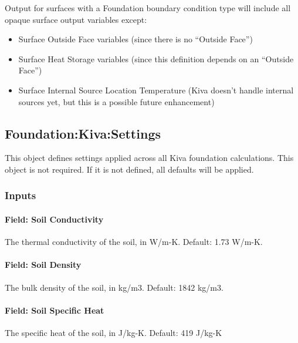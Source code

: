 Output for surfaces with a Foundation boundary condition type will
include all opaque surface output variables except:

\begin{itemize}
\tightlist
\item
  Surface Outside Face variables (since there is no ``Outside Face'')
\item
  Surface Heat Storage variables (since this definition depends on an
  ``Outside Face'')
\item
  Surface Internal Source Location Temperature (Kiva doesn't handle
  internal sources yet, but this is a possible future enhancement)
\end{itemize}

\subsection{Foundation:Kiva:Settings}\label{foundation-kiva-settings}

This object defines settings applied across all Kiva foundation
calculations. This object is not required. If it is not defined, all
defaults will be applied.

\subsubsection{Inputs}\label{foundation-kiva-settings-inputs}

\paragraph{Field: Soil Conductivity}\label{foundation-kiva-settings-soil-conductivity}

The thermal conductivity of the soil, in W/m-K. Default: 1.73 W/m-K.

\paragraph{Field: Soil Density}\label{foundation-kiva-settings-soil-density}

The bulk density of the soil, in kg/m3. Default: 1842 kg/m3.

\paragraph{Field: Soil Specific Heat}\label{foundation-kiva-settings-soil-specific-heater}

The specific heat of the soil, in J/kg-K. Default: 419 J/kg-K

